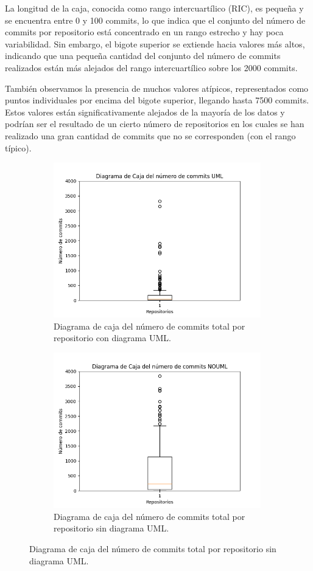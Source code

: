 \documentclass[a4paper, 12pt]{book}
\begin{document}
La longitud de la caja, conocida como rango intercuartílico (RIC), es pequeña y se encuentra entre 0 y 100 commits, lo que indica que el conjunto del número de commits por repositorio está concentrado en un rango estrecho y hay poca variabilidad.
Sin embargo, el bigote superior se extiende hacia valores más altos, indicando que una pequeña cantidad del conjunto del número de commits realizados están más alejados del rango intercuartílico sobre los 2000 commits.


También observamos la presencia de muchos valores atípicos, representados como puntos individuales por encima del bigote superior, llegando hasta 7500 commits. 
Estos valores están significativamente alejados de la mayoría de los datos y podrían ser el resultado de un cierto número de repositorios en los cuales se han realizado una gran cantidad de commits que no se corresponden (con el rango típico). 


\begin{figure}
  \centering
  \begin{subfigure}{0.45\linewidth}
    \centering
    \includegraphics[width=9cm, keepaspectratio]{img/Figure_commitsUML.png}
    \caption{Diagrama de caja del número de commits total por repositorio con diagrama UML. }\label{fig:Figure_commitsUML}
  \end{subfigure}
  \hfill
    \begin{subfigure}{0.45\linewidth}
      \centering
      \includegraphics[width=9cm, keepaspectratio]{img/Figure_commitsNOUML.png}
      \caption{Diagrama de caja del número de commits total por repositorio sin diagrama UML.}\label{fig:Figure_commitsNOUML}
  \end{subfigure}
\end{figure}
\end{document}
